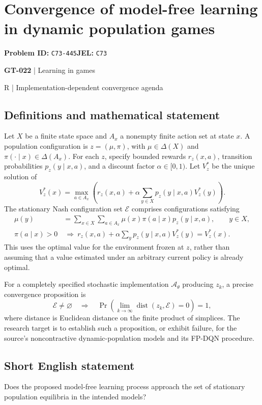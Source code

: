 \documentclass[11pt,a4paper]{article}
\begin{document}
\section*{Convergence of model-free learning in dynamic population games}
\textbf{Problem ID:} \texttt{C73-445}\quad \textbf{JEL:} \texttt{C73}\par
\label{problem:OP-0152}
\label{game:GT-022}
{\sffamily\small\color{muted}
{\sffamily\small\color{muted}\textbf{GT-022} | Learning in games\par R | Implementation-dependent convergence agenda\par}
\par}
\subsection*{Definitions and mathematical statement}
Let $X$ be a finite state space and $A_x$ a nonempty finite action set at state $x$. A population configuration is $z=(\mu,\pi)$, with $\mu\in\Delta(X)$ and $\pi(\cdot\mid x)\in\Delta(A_x)$. For each $z$, specify bounded rewards $r_z(x,a)$, transition probabilities $p_z(y\mid x,a)$, and a discount factor $\alpha\in[0,1)$. Let $V_z^*$ be the unique solution of
\[
 V_z^*(x)=\max_{a\in A_x}\left(r_z(x,a)+\alpha\sum_{y\in X}p_z(y\mid x,a)V_z^*(y)\right).
\]
The stationary Nash configuration set $\mathcal E$ comprises configurations satisfying
\begin{align*}
 \mu(y)&=\sum_{x\in X}\sum_{a\in A_x}\mu(x)\pi(a\mid x)p_z(y\mid x,a),\qquad y\in X,\\
 \pi(a\mid x)>0&\ \Longrightarrow\ 
 r_z(x,a)+\alpha\sum_y p_z(y\mid x,a)V_z^*(y)=V_z^*(x).
\end{align*}
This uses the optimal value for the environment frozen at $z$, rather than assuming that a value estimated under an arbitrary current policy is already optimal.

For a completely specified stochastic implementation $\mathcal A_\theta$ producing $z_k$, a precise convergence proposition is
\[
 \mathcal E\ne\varnothing\quad\Longrightarrow\quad
 \Pr\!\left(\lim_{k\to\infty}\operatorname{dist}(z_k,\mathcal E)=0\right)=1,
\]
where distance is Euclidean distance on the finite product of simplices. The research target is to establish such a proposition, or exhibit failure, for the source's noncontractive dynamic-population models and its FP-DQN procedure.
\subsection*{Short English statement}
Does the proposed model-free learning process approach the set of stationary population equilibria in the intended models?
\end{document}
